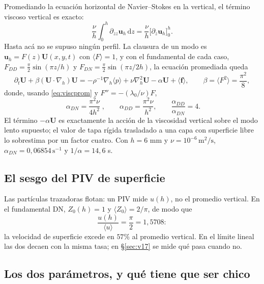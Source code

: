 \documentclass[11pt,a4paper]{article}
\newcommand{\avg}[1]{\langle #1\rangle}
\newcommand{\dd}{\mathrm{d}}
\begin{document}
Promediando la ecuación horizontal de Navier--Stokes en la vertical, el término viscoso
vertical es exacto:
\begin{equation}
  \frac{\nu}{h}\int_0^h\partial_{zz}\boldsymbol u_h\,\dd z
  =\frac{\nu}{h}\big[\partial_z\boldsymbol u_h\big]_0^h .
  \label{eq:viscprom}
\end{equation}
Hasta acá no se supuso ningún perfil. La clausura de un modo es
$\boldsymbol u_h=F(z)\boldsymbol U(x,y,t)$ con $\avg F=1$, y con el fundamental de cada
caso, $F_{DD}=\frac\pi2\sin(\pi z/h)$ y $F_{DN}=\frac\pi2\sin(\pi z/2h)$, la ecuación
promediada queda
\begin{equation}
  \partial_t\boldsymbol U+\beta(\boldsymbol U\cdot\nabla_h)\boldsymbol U
  =-\rho^{-1}\nabla_h\avg p+\nu\nabla_h^2\boldsymbol U-\alpha\boldsymbol U+\avg{\boldsymbol f},
  \qquad \beta=\avg{F^2}=\frac{\pi^2}{8},
\end{equation}
donde, usando \eqref{eq:viscprom} y $F''=-(\lambda_0/\nu)F$,
\begin{equation}
  \boxed{\;\alpha_{DN}=\frac{\pi^2\nu}{4h^2}\;},\qquad
  \alpha_{DD}=\frac{\pi^2\nu}{h^2},\qquad
  \frac{\alpha_{DD}}{\alpha_{DN}}=4 .
  \label{eq:alfa}
\end{equation}
El término $-\alpha\boldsymbol U$ es exactamente la acción de la viscosidad vertical sobre
el modo lento supuesto; el valor de tapa rígida trasladado a una capa con superficie
libre lo sobrestima por un factor cuatro. Con $h=6$ mm y $\nu=10^{-6}\,\mathrm{m^2/s}$,
$\alpha_{DN}=0{,}06854\,\mathrm{s^{-1}}$ y $1/\alpha=14{,}6$ s.

\subsection{El sesgo del PIV de superficie}

Las partículas trazadoras flotan: un PIV mide $u(h)$, no el promedio vertical. En el
fundamental DN, $Z_0(h)=1$ y $\avg{Z_0}=2/\pi$, de modo que
\begin{equation}
  \frac{u(h)}{\avg u}=\frac{\pi}{2}=1{,}5708 :
  \label{eq:piv}
\end{equation}
la velocidad de superficie excede en $57\%$ al promedio vertical. En el límite lineal
las dos decaen con la misma tasa; en §\ref{sec:v17} se mide qué pasa cuando no.

\subsection{Los dos parámetros, y qué tiene que ser chico}
\label{sec:delta}
\end{document}
